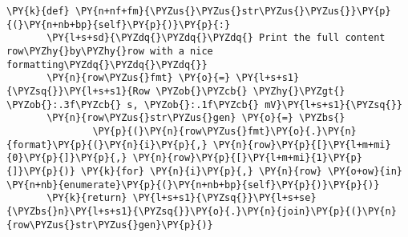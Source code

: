 \begin{Verbatim}[label=\makebox{\url{https://github.com/lucabaldini/cmepda/tree/master/slides/latex/snippets/voltage\_data\_2.py}},commandchars=\\\{\}]
   \PY{k}{def} \PY{n+nf+fm}{\PYZus{}\PYZus{}str\PYZus{}\PYZus{}}\PY{p}{(}\PY{n+nb+bp}{self}\PY{p}{)}\PY{p}{:}
       \PY{l+s+sd}{\PYZdq{}\PYZdq{}\PYZdq{} Print the full content row\PYZhy{}by\PYZhy{}row with a nice formatting\PYZdq{}\PYZdq{}\PYZdq{}}
       \PY{n}{row\PYZus{}fmt} \PY{o}{=} \PY{l+s+s1}{\PYZsq{}}\PY{l+s+s1}{Row \PYZob{}\PYZcb{} \PYZhy{}\PYZgt{} \PYZob{}:.3f\PYZcb{} s, \PYZob{}:.1f\PYZcb{} mV}\PY{l+s+s1}{\PYZsq{}}
       \PY{n}{row\PYZus{}str\PYZus{}gen} \PY{o}{=} \PYZbs{}
               \PY{p}{(}\PY{n}{row\PYZus{}fmt}\PY{o}{.}\PY{n}{format}\PY{p}{(}\PY{n}{i}\PY{p}{,} \PY{n}{row}\PY{p}{[}\PY{l+m+mi}{0}\PY{p}{]}\PY{p}{,} \PY{n}{row}\PY{p}{[}\PY{l+m+mi}{1}\PY{p}{]}\PY{p}{)} \PY{k}{for} \PY{n}{i}\PY{p}{,} \PY{n}{row} \PY{o+ow}{in} \PY{n+nb}{enumerate}\PY{p}{(}\PY{n+nb+bp}{self}\PY{p}{)}\PY{p}{)}
       \PY{k}{return} \PY{l+s+s1}{\PYZsq{}}\PY{l+s+se}{\PYZbs{}n}\PY{l+s+s1}{\PYZsq{}}\PY{o}{.}\PY{n}{join}\PY{p}{(}\PY{n}{row\PYZus{}str\PYZus{}gen}\PY{p}{)}
\end{Verbatim}